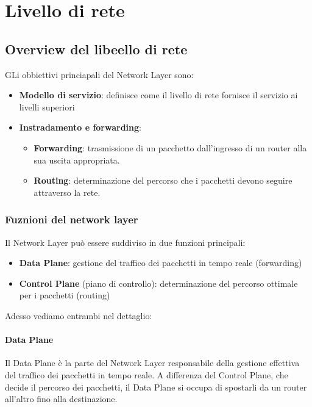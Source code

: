 % 
\chapter{Livello di rete}
\section{Overview del libeello di rete}

GLi obbiettivi princiapali del Network Layer sono:
\begin{itemize}
    \item \textbf{Modello di servizio}: definisce come il livello di rete fornisce il servizio ai livelli superiori
    \item \textbf{Instradamento e forwarding}:
    \begin{itemize}
        \item \textbf{Forwarding}: trasmissione di un pacchetto dall’ingresso di un router alla sua uscita appropriata.
        \item \textbf{Routing}: determinazione del percorso che i pacchetti devono seguire attraverso la rete.
    \end{itemize}
\end{itemize}

\subsection{Fuznioni del network layer}
Il Network Layer può essere suddiviso in due funzioni principali:
\begin{itemize}
    \item \textbf{Data Plane}: gestione del traffico dei pacchetti in tempo reale (forwarding)
    \item \textbf{Control Plane} (piano di controllo): determinazione del percorso ottimale per i pacchetti (routing)
\end{itemize}

Adesso vediamo entrambi nel dettaglio:

\subsubsection{Data Plane}
Il Data Plane è la parte del Network Layer responsabile della gestione effettiva del traffico dei pacchetti in tempo reale. A differenza del Control Plane, che decide il percorso dei pacchetti, il Data Plane si occupa di spostarli da un router all’altro fino alla destinazione.

